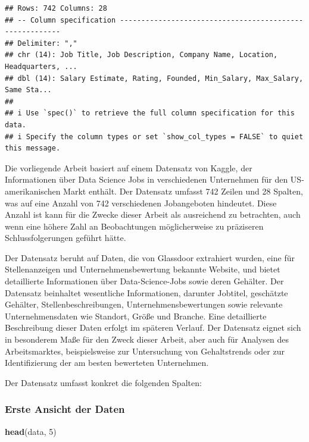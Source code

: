 \documentclass[
]{article}
\newenvironment{Shaded}{\begin{snugshade}}{\end{snugshade}}
\newcommand{\DecValTok}[1]{\textcolor[rgb]{0.00,0.00,0.81}{#1}}
\newcommand{\FunctionTok}[1]{\textcolor[rgb]{0.13,0.29,0.53}{\textbf{#1}}}
\newcommand{\NormalTok}[1]{#1}
\begin{document}
\begin{verbatim}
## Rows: 742 Columns: 28
## -- Column specification --------------------------------------------------------
## Delimiter: ","
## chr (14): Job Title, Job Description, Company Name, Location, Headquarters, ...
## dbl (14): Salary Estimate, Rating, Founded, Min_Salary, Max_Salary, Same Sta...
## 
## i Use `spec()` to retrieve the full column specification for this data.
## i Specify the column types or set `show_col_types = FALSE` to quiet this message.
\end{verbatim}

Die vorliegende Arbeit basiert auf einem Datensatz von Kaggle, der
Informationen über Data Science Jobs in verschiedenen Unternehmen für
den US-amerikanischen Markt enthält. Der Datensatz umfasst 742 Zeilen
und 28 Spalten, was auf eine Anzahl von 742 verschiedenen Jobangeboten
hindeutet. Diese Anzahl ist kann für die Zwecke dieser Arbeit als
ausreichend zu betrachten, auch wenn eine höhere Zahl an Beobachtungen
möglicherweise zu präziseren Schlussfolgerungen geführt hätte.

Der Datensatz beruht auf Daten, die von Glassdoor extrahiert wurden,
eine für Stellenanzeigen und Unternehmensbewertung bekannte Website, und
bietet detaillierte Informationen über Data-Science-Jobs sowie deren
Gehälter. Der Datensatz beinhaltet wesentliche Informationen, darunter
Jobtitel, geschätzte Gehälter, Stellenbeschreibungen,
Unternehmensbewertungen sowie relevante Unternehmensdaten wie Standort,
Größe und Branche. Eine detaillierte Beschreibung dieser Daten erfolgt
im späteren Verlauf. Der Datensatz eignet sich in besonderem Maße für
den Zweck dieser Arbeit, aber auch für Analysen des Arbeitsmarktes,
beispielsweise zur Untersuchung von Gehaltstrends oder zur
Identifizierung der am besten bewerteten Unternehmen.

Der Datensatz umfasst konkret die folgenden Spalten:

\subsubsection{Erste Ansicht der Daten}\label{erste-ansicht-der-daten}

\begin{Shaded}
\begin{Highlighting}[]
\FunctionTok{head}\NormalTok{(data, }\DecValTok{5}\NormalTok{)}
\end{Highlighting}
\end{Shaded}
\end{document}
